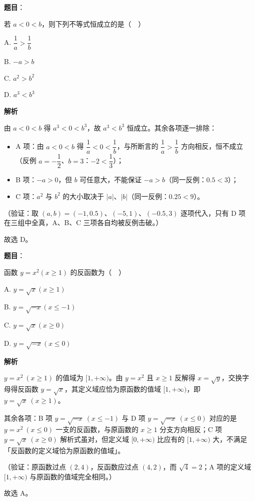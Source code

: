 \begin{answer}

\textbf{题目}：

若 \(a<0<b\)，则下列不等式恒成立的是（　）

A. \(\dfrac{1}{a}>\dfrac{1}{b}\)

B. \(-a>b\)

C. \(a^{2}>b^{2}\)

D. \(a^{3}<b^{3}\)

\textbf{解析}

由 \(a<0<b\) 得 \(a^{3}<0<b^{3}\)，故 \(a^{3}<b^{3}\) 恒成立。其余各项逐一排除：

\begin{itemize}
\item A 项：由 \(a<0<b\) 得 \(\dfrac{1}{a}<0<\dfrac{1}{b}\)，与所断言的 \(\dfrac{1}{a}>\dfrac{1}{b}\) 方向相反，恒不成立（反例 \(a=-\dfrac{1}{2}\)、\(b=3\)：\(-2<\dfrac{1}{3}\)）；
\item B 项：\(-a>0\)，但 \(b\) 可任意大，不能保证 \(-a>b\)（同一反例：\(0.5<3\)）；
\item C 项：\(a^{2}\) 与 \(b^{2}\) 的大小取决于 \(|a|\)、\(|b|\)（同一反例：\(0.25<9\)）。
\end{itemize}

（验证：取 \((a,b)=(-1,0.5)\)、\((-5,1)\)、\((-0.5,3)\) 逐项代入，只有 D 项在三组中全真，A、B、C 三项各自均被反例击破。）

故选 D。


\end{answer}
\begin{answer}

\textbf{题目}：

函数 \(y=x^{2}(x\geqslant 1)\) 的反函数为（　）

A. \(y=\sqrt{x}(x\geqslant 1)\)

B. \(y=\sqrt{-x}(x\leqslant -1)\)

C. \(y=\sqrt{x}(x\geqslant 0)\)

D. \(y=\sqrt{-x}(x\leqslant 0)\)

\textbf{解析}

\(y=x^{2}\ (x\geqslant1)\) 的值域为 \([1,+\infty)\)。由 \(y=x^{2}\) 且 \(x\geqslant1\) 反解得 \(x=\sqrt{y}\)，交换字母得反函数 \(y=\sqrt{x}\)，其定义域应恰为原函数的值域 \([1,+\infty)\)，即 \(y=\sqrt{x}\ (x\geqslant1)\)。

其余各项：B 项 \(y=\sqrt{-x}\ (x\leqslant-1)\) 与 D 项 \(y=\sqrt{-x}\ (x\leqslant0)\) 对应的是 \(y=x^{2}\ (x\leqslant0)\) 一支的反函数，与原函数的 \(x\geqslant1\) 分支方向相反；C 项 \(y=\sqrt{x}\ (x\geqslant0)\) 解析式虽对，但定义域 \([0,+\infty)\) 比应有的 \([1,+\infty)\) 大，不满足「反函数的定义域恰为原函数的值域」。

（验证：原函数过点 \((2,4)\)，反函数应过点 \((4,2)\)，而 \(\sqrt{4}=2\)；A 项的定义域 \([1,+\infty)\) 与原函数的值域完全相同。）

故选 A。


\end{answer}

